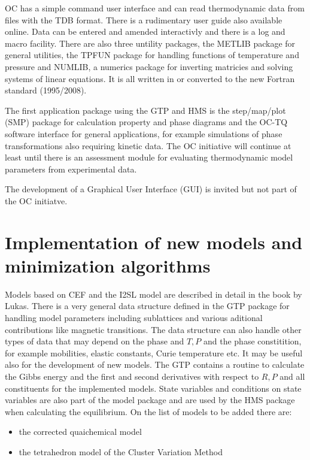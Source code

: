 \documentclass[12pt]{article}
\begin{document}
OC has a simple command user interface and can read thermodynamic data
from files with the TDB format\cite{TDB}.  There is a rudimentary user
guide also available online.  Data can be entered and amended
interactivly and there is a log and macro facility.  There are also
three untility packages, the METLIB package for general utilities, the
TPFUN package for handling functions of temperature and pressure and
NUMLIB, a numerics package for inverting matricies and solving systems
of linear equations.  It is all written in or converted to the new
Fortran standard (1995/2008).

The first application package using the GTP and HMS is the
step/map/plot (SMP) package for calculation property and phase
diagrams and the OC-TQ software interface for general applications,
for example simulations of phase transformations also requiring
kinetic data.  The OC initiative will continue at least until there is
an assessment module for evaluating thermodynamic model
parameters from experimental data.

The development of a Graphical User Interface (GUI) is invited but not
part of the OC initiatve.

\section{Implementation of new models and minimization algorithms}

Models based on CEF and the I2SL model are described in detail in the
book by Lukas\cite{07Luk}.  There is a very general data structure
defined in the GTP package for handling model parameters including
sublattices and various aditional contributions like magnetic
transitions.  The data structure can also handle other types of data
that may depend on the phase and $T, P$ and the phase constitition,
for example mobilities, elastic constants, Curie temperature etc.  It
may be useful also for the development of new models.  The GTP
contains a routine to calculate the Gibbs energy and the first and
second derivatives with respect to $R, P$ and all constituents for the
implemented models.  State variables and conditions on state variables
are also part of the model package and are used by the HMS package
when calculating the equilibrium.  On the list of models to be added
there are:

\begin{itemize}
\item the corrected quaichemical model\cite{08Hil}
\item the tetrahedron model of the Cluster Variation Method\cite{51Kik}
\end{itemize}
\end{document}
